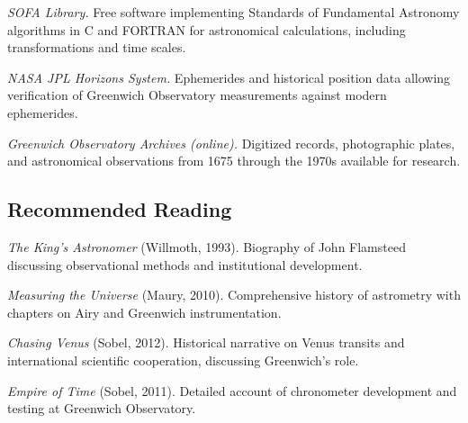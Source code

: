 \textit{SOFA Library.} Free software implementing Standards of Fundamental Astronomy algorithms in C and FORTRAN for astronomical calculations, including transformations and time scales.

\textit{NASA JPL Horizons System.} Ephemerides and historical position data allowing verification of Greenwich Observatory measurements against modern ephemerides.

\textit{Greenwich Observatory Archives (online).} Digitized records, photographic plates, and astronomical observations from 1675 through the 1970s available for research.

\subsection*{Recommended Reading}

\textit{The King's Astronomer} (Willmoth, 1993). Biography of John Flamsteed discussing observational methods and institutional development.

\textit{Measuring the Universe} (Maury, 2010). Comprehensive history of astrometry with chapters on Airy and Greenwich instrumentation.

\textit{Chasing Venus} (Sobel, 2012). Historical narrative on Venus transits and international scientific cooperation, discussing Greenwich's role.

\textit{Empire of Time} (Sobel, 2011). Detailed account of chronometer development and testing at Greenwich Observatory.
